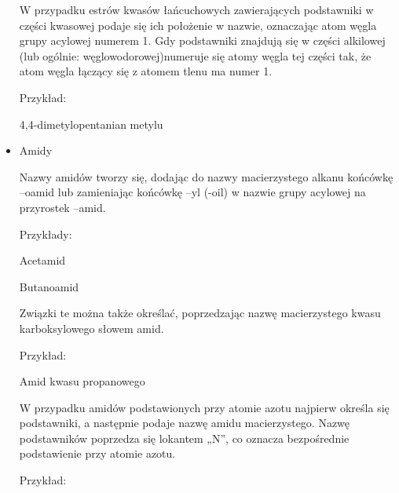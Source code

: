 \begin{itemize}
    W przypadku estrów kwasów łańcuchowych zawierających podstawniki w części kwasowej podaje się ich położenie w nazwie, oznaczając atom węgla grupy acylowej numerem 1. Gdy podstawniki znajdują się w części alkilowej (lub ogólnie: węglowodorowej)numeruje się atomy węgla tej części tak, że atom węgla łączący się z atomem tlenu ma numer 1.

    \begin{center}
        Przykład:
    
        
        4,4-dimetylopentanian metylu
    \end{center}

    \item Amidy
    

    Nazwy amidów tworzy się, dodając do nazwy macierzystego alkanu końcówkę –oamid lub zamieniając końcówkę –yl (-oil) w nazwie grupy acylowej na przyrostek –amid.

    \begin{center}
        Przykłady:
    
        
        Acetamid
    \end{center}
    \begin{center}
         
        
        Butanoamid
    \end{center}

    Związki te można także określać, poprzedzając nazwę macierzystego kwasu karboksylowego słowem amid.

    \begin{center}
         Przykład:

        
        Amid kwasu propanowego
    \end{center}

    W przypadku amidów podstawionych przy atomie azotu najpierw określa się podstawniki, a następnie podaje nazwę amidu macierzystego. Nazwę podstawników poprzedza się lokantem „N”, co oznacza bezpośrednie podstawienie przy atomie azotu.

    \begin{center}
        Przykład:


\end{center}
\end{itemize}
